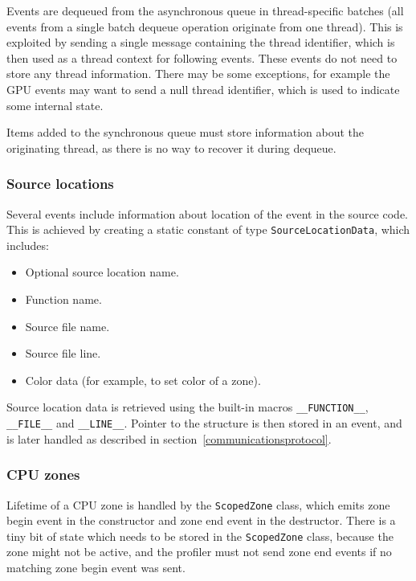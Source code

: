 \documentclass[hidelinks,titlepage,a4paper]{article}
\begin{document}
Events are dequeued from the asynchronous queue in thread-specific batches (all events from a single batch dequeue operation originate from one thread). This is exploited by sending a single message containing the thread identifier, which is then used as a thread context for following events. These events do not need to store any thread information. There may be some exceptions, for example the GPU events may want to send a null thread identifier, which is used to indicate some internal state.

Items added to the synchronous queue must store information about the originating thread, as there is no way to recover it during dequeue.

\subsubsection{Source locations}

Several events include information about location of the event in the source code. This is achieved by creating a static constant of type \texttt{SourceLocationData}, which includes:

\begin{itemize}
\item Optional source location name.
\item Function name.
\item Source file name.
\item Source file line.
\item Color data (for example, to set color of a zone).
\end{itemize}

Source location data is retrieved using the built-in macros \texttt{\_\_FUNCTION\_\_}, \texttt{\_\_FILE\_\_} and \texttt{\_\_LINE\_\_}. Pointer to the structure is then stored in an event, and is later handled as described in section~\ref{communicationsprotocol}.

\subsubsection{CPU zones}
\label{cpuzones}

Lifetime of a CPU zone is handled by the \texttt{ScopedZone} class, which emits zone begin event in the constructor and zone end event in the destructor. There is a tiny bit of state which needs to be stored in the \texttt{ScopedZone} class, because the zone might not be active, and the profiler must not send zone end events if no matching zone begin event was sent.
\end{document}
